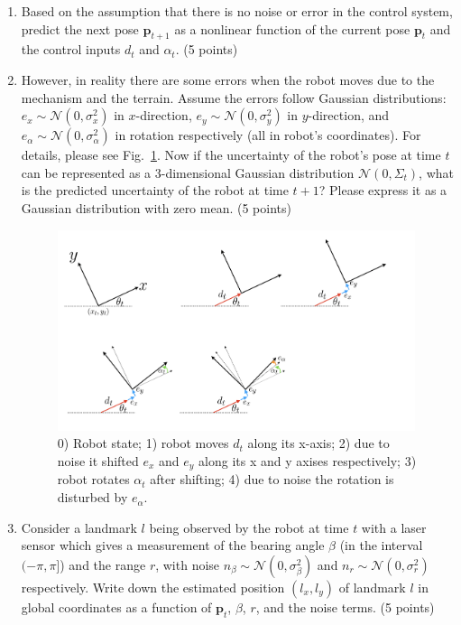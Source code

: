 \documentclass[12pt, a4paper]{article}
\begin{document}
\begin{enumerate}
	\item Based on the assumption that there is no noise or error in the
	      control system, predict the next pose $\mathbf{p}_{t+1}$ as a nonlinear
	      function of the current pose $\mathbf{p}_{t}$ and the control inputs
	      $d_{t}$ and $\alpha_{t}$. (5 points)

	\item However, in reality there are some errors when the robot moves
	      due to the mechanism and the terrain. Assume the errors follow Gaussian
	      distributions: $e_{x}\sim\mathcal{N}\left(0,\sigma_{x}^{2}\right)$
	      in $x$-direction, $e_{y}\sim\mathcal{N}\left(0,\sigma_{y}^{2}\right)$
	      in $y$-direction, and $e_{\alpha}\sim\mathcal{N}\left(0,\sigma_{\alpha}^{2}\right)$
	      in rotation respectively (all in robot's coordinates). For details, please see Fig.~\ref{fig:1b}.
	      Now if the uncertainty of the robot's pose at time $t$ can be represented as
	      a 3-dimensional Gaussian distribution $\mathcal{N}\left(0,\Sigma_{t}\right)$,
	      what is the predicted uncertainty of the robot at time $t+1$? Please
	      express it as a Gaussian distribution with zero mean. (5 points)
	      \begin{figure}
		      \centering
		      \includegraphics[width=0.99\textwidth]{1b.png}
		      \caption{0) Robot state; 1) robot moves $d_t$ along its x-axis;
			      2) due to noise it shifted $e_x$ and $e_y$ along its x and y axises respectively;
			      3) robot rotates $\alpha_t$ after shifting;
			      4) due to noise the rotation is disturbed by $e_\alpha$.}
		      \label{fig:1b}
	      \end{figure}

	\item Consider a landmark $l$ being observed by the robot at time $t$
	      with a laser sensor which gives a measurement of the bearing angle
	      $\beta$ (in the interval $(-\pi,\pi]$) and the range $r$, with
	      noise $n_{\beta}\sim\mathcal{N}\left(0,\sigma_{\beta}^{2}\right)$
	      and $n_{r}\sim\mathcal{N}\left(0,\sigma_{r}^{2}\right)$ respectively.
	      Write down the estimated position $\left(l_{x},l_{y}\right)$ of landmark
	      $l$ in global coordinates as a function of $\mathbf{p}_{t}$, $\beta$,
	      $r$, and the noise terms. (5 points)


\end{enumerate}
\end{document}
